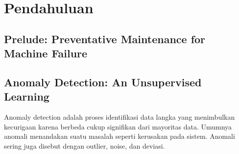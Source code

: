 \chapter{Pendahuluan}

\section{Prelude: Preventative Maintenance for Machine Failure}

\section{Anomaly Detection: An Unsupervised Learning}

Anomaly detection adalah proses identifikasi data langka yang menimbulkan kecurigaan karena berbeda cukup signifikan dari mayoritas data. Umumnya anomali menandakan suatu masalah seperti kerusakan pada sistem. Anomali sering juga disebut dengan outlier, noise, dan deviasi.

